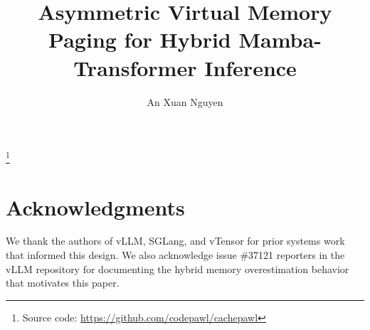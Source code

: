 \documentclass[sigconf, nonacm, screen]{acmart}
\begin{document}
\sloppy

\title{Asymmetric Virtual Memory Paging for Hybrid Mamba-Transformer Inference}
\thanks{Source code: \url{https://github.com/codepawl/cachepawl}}

\author{An Xuan Nguyen}

\maketitle









\section*{Acknowledgments}
We thank the authors of vLLM, SGLang, and vTensor for prior systems work that informed this design. We also acknowledge issue \#37121 reporters in the vLLM repository for documenting the hybrid memory overestimation behavior that motivates this paper.

\balance


\end{document}

